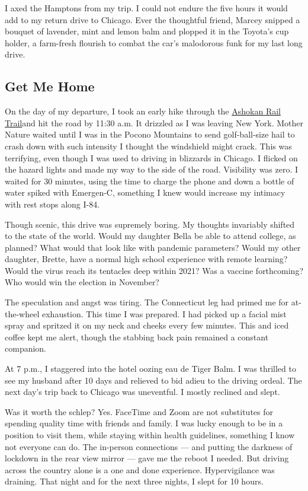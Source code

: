 I axed the Hamptons from my trip. I could not endure the five hours it
would add to my return drive to Chicago. Ever the thoughtful friend,
Marcey snipped a bouquet of lavender, mint and lemon balm and plopped it
in the Toyota's cup holder, a farm-fresh flourish to combat the car's
malodorous funk for my last long drive.

\hypertarget{get-me-home}{%
\subsection{Get Me Home}\label{get-me-home}}

On the day of my departure, I took an early hike through the
\href{https://ashokanrailtrail.com/}{Ashokan Rail Trail}and hit the road
by 11:30 a.m. It drizzled as I was leaving New York. Mother Nature
waited until I was in the Pocono Mountains to send golf-ball-size hail
to crash down with such intensity I thought the windshield might crack.
This was terrifying, even though I was used to driving in blizzards in
Chicago. I flicked on the hazard lights and made my way to the side of
the road. Visibility was zero. I waited for 30 minutes, using the time
to charge the phone and down a bottle of water spiked with Emergen-C,
something I knew would increase my intimacy with rest stops along I-84.

Though scenic, this drive was supremely boring. My thoughts invariably
shifted to the state of the world. Would my daughter Bella be able to
attend college, as planned? What would that look like with pandemic
parameters? Would my other daughter, Brette, have a normal high school
experience with remote learning? Would the virus reach its tentacles
deep within 2021? Was a vaccine forthcoming? Who would win the election
in November?

The speculation and angst was tiring. The Connecticut leg had primed me
for at-the-wheel exhaustion. This time I was prepared. I had picked up a
facial mist spray and spritzed it on my neck and cheeks every few
minutes. This and iced coffee kept me alert, though the stabbing back
pain remained a constant companion.

At 7 p.m., I staggered into the hotel oozing eau de Tiger Balm. I was
thrilled to see my husband after 10 days and relieved to bid adieu to
the driving ordeal. The next day's trip back to Chicago was uneventful.
I mostly reclined and slept.

Was it worth the schlep? Yes. FaceTime and Zoom are not substitutes for
spending quality time with friends and family. I was lucky enough to be
in a position to visit them, while staying within health guidelines,
something I know not everyone can do. The in-person connections --- and
putting the darkness of lockdown in the rear view mirror --- gave me the
reboot I needed. But driving across the country alone is a one and done
experience. Hypervigilance was draining. That night and for the next
three nights, I slept for 10 hours.


